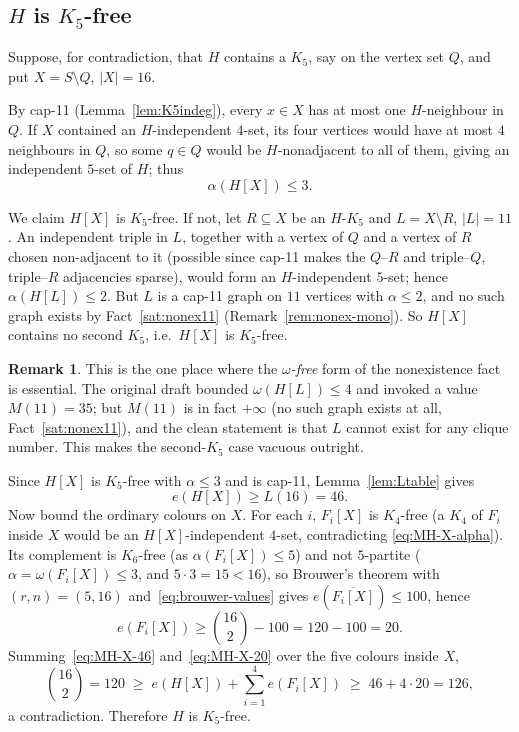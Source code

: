 \documentclass[11pt,reqno]{amsart}
\theoremstyle{definition}
\newtheorem{remark}[theorem]{Remark}
\theoremstyle{remark}
\newcommand{\abs}[1]{\left|#1\right|}
\newcommand{\capeleven}{\textsf{cap-11}}
\begin{document}
\subsection{$H$ is $K_5$-free}\label{ssec:MH-K5free}
Suppose, for contradiction, that $H$ contains a $K_5$, say on the vertex set $Q$,
and put $X=S\setminus Q$, $\abs X=16$.

By \capeleven{} (Lemma~\ref{lem:K5indeg}), every $x\in X$ has at most one
$H$-neighbour in $Q$. If $X$ contained an $H$-independent $4$-set, its four
vertices would have at most $4$ neighbours in $Q$, so some $q\in Q$ would be
$H$-nonadjacent to all of them, giving an independent $5$-set of $H$; thus
\begin{equation}\label{eq:MH-X-alpha}
  \alpha(H[X])\le 3 .
\end{equation}

We claim $H[X]$ is $K_5$-free. If not, let $R\subseteq X$ be an $H$-$K_5$ and
$L=X\setminus R$, $\abs L=11$. An independent triple in $L$, together with a vertex
of $Q$ and a vertex of $R$ chosen non-adjacent to it (possible since \capeleven{}
makes the $Q$--$R$ and triple--$Q$, triple--$R$ adjacencies sparse), would form an
$H$-independent $5$-set; hence $\alpha(H[L])\le 2$. But $L$ is a \capeleven{} graph
on $11$ vertices with $\alpha\le 2$, and no such graph exists by
Fact~\ref{sat:nonex11} (Remark~\ref{rem:nonex-mono}). So $H[X]$ contains no second
$K_5$, i.e.\ $H[X]$ is $K_5$-free.

\begin{remark}
This is the one place where the \emph{$\omega$-free} form of the nonexistence fact
is essential. The original draft bounded $\omega(H[L])\le 4$ and invoked a value
$M(11)=35$; but $M(11)$ is in fact $+\infty$ (no such graph exists at all,
Fact~\ref{sat:nonex11}), and the clean statement is that $L$ cannot exist for any
clique number. This makes the second-$K_5$ case vacuous outright.
\end{remark}

Since $H[X]$ is $K_5$-free with $\alpha\le 3$ and is \capeleven, Lemma~\ref{lem:Ltable}
gives
\begin{equation}\label{eq:MH-X-46}
  e(H[X])\ge L(16)=46 .
\end{equation}
Now bound the ordinary colours on $X$. For each $i$, $F_i[X]$ is $K_4$-free (a $K_4$
of $F_i$ inside $X$ would be an $H[X]$-independent $4$-set, contradicting
\eqref{eq:MH-X-alpha}). Its complement is $K_6$-free (as $\alpha(F_i[X])\le 5$) and
not $5$-partite ($\alpha=\omega(F_i[X])\le 3$, and $5\cdot 3=15<16$), so Brouwer's
theorem with $(r,n)=(5,16)$ and~\eqref{eq:brouwer-values} gives
$e(\overline{F_i[X]})\le 100$, hence
\begin{equation}\label{eq:MH-X-20}
  e(F_i[X])\ge\binom{16}{2}-100=120-100=20 .
\end{equation}
Summing~\eqref{eq:MH-X-46} and~\eqref{eq:MH-X-20} over the five colours inside $X$,
\[
  \binom{16}{2}=120\;\ge\; e(H[X])+\sum_{i=1}^4 e(F_i[X])\;\ge\; 46+4\cdot 20=126,
\]
a contradiction. Therefore $H$ is $K_5$-free.
\end{document}
